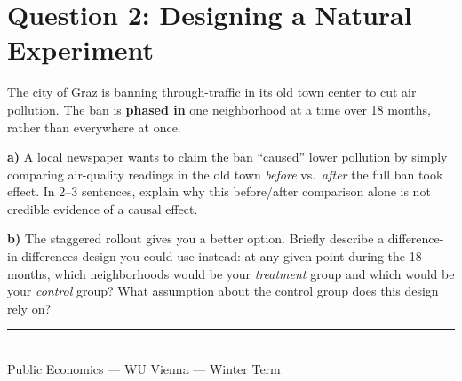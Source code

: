\documentclass[11pt]{article}
\newcommand{\qpart}[1]{\par\vspace{0.4em}\noindent\textbf{#1}\quad}
\begin{document}
\section*{Question 2: Designing a Natural Experiment}

The city of Graz is banning through-traffic in its old town center to cut air pollution. The ban is \textbf{phased in} one neighborhood at a time over 18 months, rather than everywhere at once.

\qpart{a)} A local newspaper wants to claim the ban ``caused'' lower pollution by simply comparing air-quality readings in the old town \emph{before} vs.\ \emph{after} the full ban took effect. In 2--3 sentences, explain why this before/after comparison alone is not credible evidence of a causal effect.

\qpart{b)} The staggered rollout gives you a better option. Briefly describe a difference-in-differences design you could use instead: at any given point during the 18 months, which neighborhoods would be your \emph{treatment} group and which would be your \emph{control} group? What assumption about the control group does this design rely on?

\vspace{1.5em}
\noindent\textcolor{wugray}{\rule{\linewidth}{0.4pt}}\\
{\footnotesize\color{wugray} Public Economics --- WU Vienna --- Winter Term}
\end{document}
